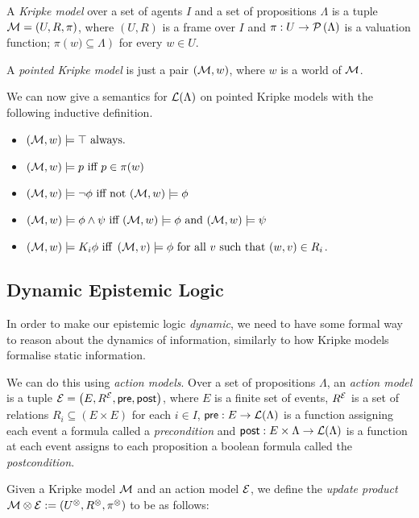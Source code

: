 \documentclass[12pt, a4paper]{article} %
\begin{document}
A \textit{Kripke model} over a set of agents $I$ and a set of propositions $\Lambda$ is a tuple $\mathcal{M} = \left(U, R, \pi\right)$, where $\left(U, R\right)$ is a frame over $I$ and $\pi : U \to \mathcal{P}\left(\Lambda\right)$ is a valuation function; $\pi\left(w) \subseteq \Lambda\right)$ for every $w \in U$.

A \textit{pointed Kripke model} is just a pair $\left(\mathcal{M}, w\right)$, where $w$ is a world of $\mathcal{M}$.

\hfill

We can now give a semantics for $\mathcal{L}(\Lambda)$ on pointed Kripke models with the following inductive definition.

\begin{itemize}
    \item $(\mathcal{M}, w) \models \top \text{ always.}$
    \item $(\mathcal{M}, w) \models p \text{ iff } p \in \pi(w)$
    \item $(\mathcal{M}, w) \models \neg \phi \text{ iff not } (\mathcal{M}, w) \models \phi $
    \item $(\mathcal{M}, w) \models \phi \land \psi \text{ iff } (\mathcal{M}, w) \models \phi \text{ and } (\mathcal{M}, w) \models \psi$
    \item $(\mathcal{M}, w) \models K_i \phi \text{ iff } \left(\mathcal{M}, v\right) \models \phi \text{ for all } v \text{ such that } (w, v) \in R_i$.
\end{itemize}

\subsection{Dynamic Epistemic Logic}

In order to make our epistemic logic \textit{dynamic}, we need to have some formal way to reason about the dynamics of information, similarly to how Kripke models formalise static information. 

We can do this using \textit{action models}. Over a set of propositions $\Lambda$, an \textit{action model} is a tuple $\mathcal{E} = \left(E, R^{\mathcal{E}}, \textsf{pre}, \textsf{post}\right)$, where $E$ is a finite set of events, $R^{\mathcal{E}}$ is a set of relations $R_i \subseteq (E \times E)$ for each $i \in I$, $\textsf{pre} : E \to \mathcal{L}(\Lambda)$ is a function assigning each event a formula called a \textit{precondition} and $\textsf{post} : E \times \Lambda \to \mathcal{L}(\Lambda)$ is a function at each event assigns to each proposition a boolean formula called the \textit{postcondition}.

Given a Kripke model $\mathcal{M}$ and an action model $\mathcal{E}$, we define the \textit{update product} $\mathcal{M} \otimes \mathcal{E} := \left(U^{\otimes}, R^{\otimes}, \pi^{\otimes}\right)$ to be as follows:
\end{document}
